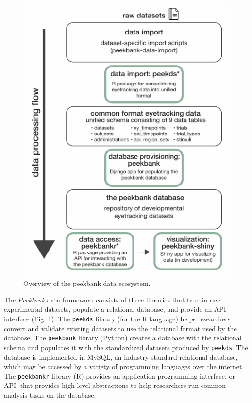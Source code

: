\documentclass[10pt, letterpaper]{article}
\newenvironment{CodeChunk}{}{}
\begin{document}
\begin{CodeChunk}
\begin{figure}[tb]

{\centering \includegraphics{figs/fig_framework_overview-1} 

}

\caption[Overview of the peekbank data ecosystem]{Overview of the peekbank data ecosystem.}\label{fig:fig_framework_overview}
\end{figure}
\end{CodeChunk}

The \emph{Peekbank} data framework consists of three libraries that take
in raw experimental datasets, populate a relational database, and
provide an API interface (Fig. \ref{fig:fig_framework_overview}). The
\texttt{peekds} library (for the R language) helps researchers convert
and validate existing datasets to use the relational format used by the
database. The \texttt{peekbank} library (Python) creates a database with
the relational schema and populates it with the standardized datasets
produced by \texttt{peekds}. The database is implemented in MySQL, an
industry standard relational database, which may be accessed by a
variety of programming languages over the internet. The
\texttt{peekbankr} library (R) provides an application programming
interface, or API, that provides high-level abstractions to help
researchers run common analysis tasks on the database.
\end{document}
